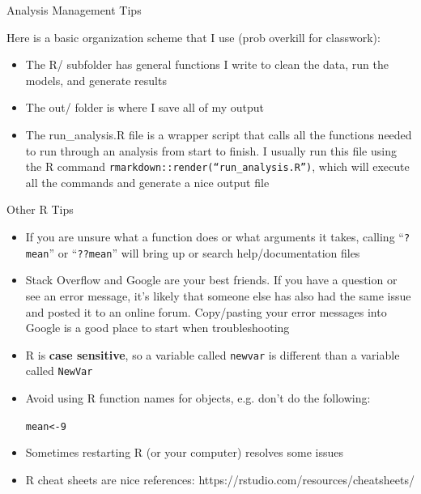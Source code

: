 \documentclass[svgnames,smaller]{beamer}\usepackage[]{graphicx}\usepackage[]{color}
\makeatletter
\newcommand{\hlnum}[1]{\textcolor[rgb]{0.686,0.059,0.569}{#1}}%
\newcommand{\hlstd}[1]{\textcolor[rgb]{0.345,0.345,0.345}{#1}}%
\newcommand{\hlkwb}[1]{\textcolor[rgb]{0.69,0.353,0.396}{#1}}%
\newenvironment{kframe}{%
 \def\at@end@of@kframe{}%
 \ifinner\ifhmode%
  \def\at@end@of@kframe{\end{minipage}}%
  \begin{minipage}{\columnwidth}%
 \fi\fi%
 \def\FrameCommand##1{\hskip\@totalleftmargin \hskip-\fboxsep
 \colorbox{shadecolor}{##1}\hskip-\fboxsep
     \hskip-\linewidth \hskip-\@totalleftmargin \hskip\columnwidth}%
 \MakeFramed {\advance\hsize-\width
   \@totalleftmargin\z@ \linewidth\hsize
   \@setminipage}}%
 {\par\unskip\endMakeFramed%
 \at@end@of@kframe}
\newenvironment{knitrout}{}{} %
\makeatother
\begin{document}

\begin{frame}{Analysis Management Tips}

Here is a basic organization scheme that I use (prob overkill for classwork):
\begin{itemize}
    \item The R/ subfolder has general functions I write to clean the data, run the models, and generate results
    \item The out/ folder is where I save all of my output
    \item The run\_analysis.R file is a wrapper script that calls all the functions needed to run through an analysis from start to finish. I usually run this file using the R command \texttt{rmarkdown::render(``run\_analysis.R'')}, which will execute all the commands and generate a nice output file
\end{itemize}
\end{frame}



\begin{frame}{Other R Tips}

\begin{itemize}
    \item If you are unsure what a function does or what arguments it takes, calling ``\texttt{?mean}'' or ``\texttt{??mean}'' will bring up or search help/documentation files
    \item Stack Overflow and Google are your best friends. If you have a question or see an error message, it's likely that someone else has also had the same issue and posted it to an online forum. Copy/pasting your error messages into Google is a good place to start when troubleshooting
    \item R is \textbf{case sensitive}, so a variable called \texttt{newvar} is different than a variable called \texttt{NewVar}
    \item Avoid using R function names for objects, e.g. don't do the following:
\begin{knitrout}\scriptsize
{}\color{fgcolor}\begin{kframe}
\begin{alltt}
\hlstd{mean} \hlkwb{<-} \hlnum{9}
\end{alltt}
\end{kframe}
\end{knitrout}
    \item Sometimes restarting R (or your computer) resolves some issues
    \item R cheat sheets are nice references: https://rstudio.com/resources/cheatsheets/
\end{itemize}
\end{frame}
\end{document}
